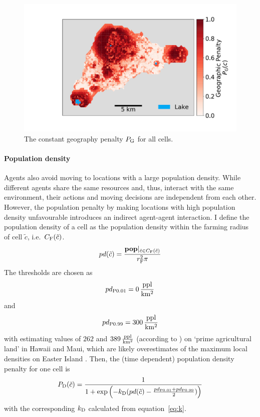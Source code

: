 \begin{figure}
	\centering
	\includegraphics[width=1\linewidth]{images/Plot_PG}
	\caption{The constant geography penalty $P_{\rm G}$ for all cells.}
	\label{fig:P_G}
\end{figure}

\paragraph{Population density} %
Agents also avoid moving to locations with a large population density.
While different agents share the same resources and, thus, interact with the same environment, their actions and moving decisions are independent from each other. 
However, the population penalty by making locations with high population density unfavourable introduces an indirect agent-agent interaction. 
I define the population density of a cell as the population density within the farming radius of cell $\tilde{c}$, i.e.\ $C_{\rm F}(\tilde{c})$.
\begin{equation}
pd (\tilde{c}) = \frac{\mathbf{pop}|_{\hat{c} \in C_{\rm F}(\tilde{c}) }}{r_{\rm F}^2 \pi}
\end{equation}
The thresholds are chosen as
\begin{equation}
pd_{\rm P0.01} = 0 \, {\rm \frac{ppl}{km^2}}
\end{equation}
and 
\begin{equation}
pd_{\rm P0.99} = 300 \, {\rm \frac{ppl}{km^2}}
\end{equation}
with \citet{Kirch2010} estimating values of $262$ and $389\, {\rm \frac{ppl}{km^2}}$ (according to \citet{Puleston2017}) on `prime agricultural land' in Hawaii and Maui, which are likely overestimates of the maximum local densities on Easter Island \citep{Puleston2017}. %
Then, the (time dependent) population density penalty for one cell is
\begin{equation}
P_{\rm D}(\tilde{c}) = \frac{1}{1+\exp\left( - k_{\rm D} (pd(\tilde{c})-\frac{pd_{\rm P0.01} + pd_{\rm P0.99}}{2}) \right)}
\end{equation}
with the corresponding $k_{\rm D}$ calculated from equation~\ref{eq:k}.
		
